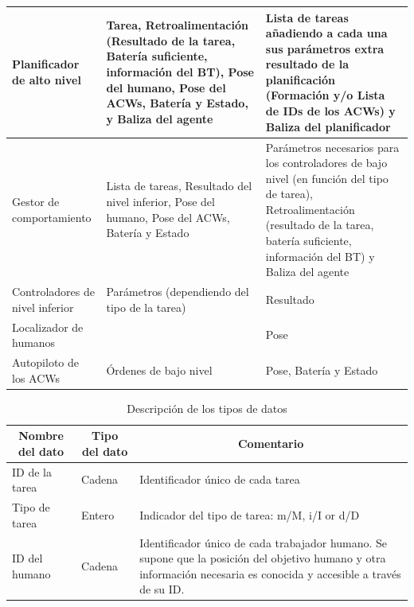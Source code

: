 \documentclass[fontsize=11pt, English=false, Español=true, Myfinal=true, twoside, numbers=noenddot]{scrbook}
\begin{document}
{\begin{table}[ht]
\begin{tabular}{|p{}|p{}|p{}|}
     Planificador de alto nivel & Tarea, Retroalimentación (Resultado de la tarea, Batería suficiente, información del \gls{BT}), Pose del humano, Pose del \glspl{ACW}, Batería y Estado, y Baliza del agente & Lista de tareas añadiendo a cada una sus parámetros extra resultado de la planificación (Formación y/o Lista de IDs de los \glspl{ACW}) y Baliza del planificador\\\hline
      
      Gestor de comportamiento & Lista de tareas, Resultado del nivel inferior, Pose del humano, Pose del \glspl{ACW}, Batería y Estado & Parámetros necesarios para los controladores de bajo nivel (en función del tipo de tarea), Retroalimentación (resultado de la tarea, batería suficiente, información del BT) y Baliza del agente \\ \hline
      
      Controladores de nivel inferior & Parámetros (dependiendo del tipo de la tarea) & Resultado \\ \hline
      
      Localizador de humanos &  & Pose \\ \hline
      
      Autopiloto de los \glspl{ACW} & Órdenes de bajo nivel & Pose, Batería y Estado \\ \hline
      
    \end{tabular}
\end{table}

\begin{table}[htb]
    \centering
    \caption{Descripción de los tipos de datos}
    \label{tab:shareddata}
    \small
    \begin{tabular}{|p{}|p{}|p{}|}
      \hline
      \multicolumn{1}{|c}{\textbf{Nombre del dato}} & \multicolumn{1}{|c|}{\textbf{Tipo del dato}} & \multicolumn{1}{c|}{\textbf{Comentario}} \\ \hline \hline
      
      ID de la tarea & Cadena & Identificador único de cada tarea \\ \hline
      
      Tipo de tarea & Entero & Indicador del tipo de tarea: m/M, i/I or d/D \\ \hline
      
      ID del humano & Cadena & Identificador único de cada trabajador humano. Se supone que la posición del objetivo humano y otra información necesaria es conocida y accesible a través de su ID. \\ \hline
      

\end{tabular}
\end{table}}
\end{document}
